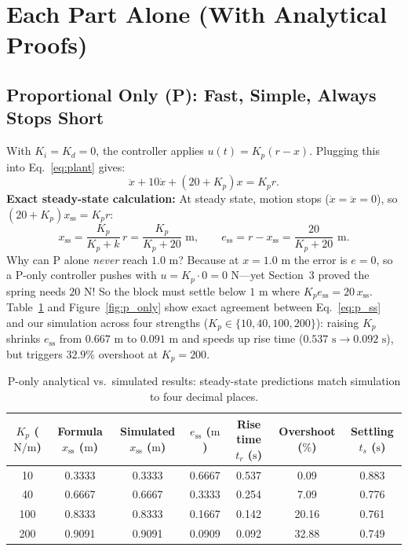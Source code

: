 \documentclass[10pt,a4paper]{article}
\begin{document}
\section{Each Part Alone (With Analytical Proofs)}

\subsection{Proportional Only (P): Fast, Simple, Always Stops Short}
With $K_i = K_d = 0$, the controller applies $u(t) = K_p(r - x)$. Plugging this into Eq.~\eqref{eq:plant} gives:
\begin{equation}
  \ddot{x} + 10\dot{x} + (20 + K_p)x = K_p r.
  \label{eq:p_closed}
\end{equation}
\textbf{Exact steady-state calculation:} At steady state, motion stops ($\dot{x} = \ddot{x} = 0$), so $(20 + K_p)x_{\text{ss}} = K_p r$:
\begin{equation}
  x_{\text{ss}} = \frac{K_p}{K_p + k}\,r = \frac{K_p}{K_p + 20}\text{ m}, \qquad
  e_{\text{ss}} = r - x_{\text{ss}} = \frac{20}{K_p + 20}\text{ m}.
  \label{eq:p_ss}
\end{equation}
Why can P alone \emph{never} reach $1.0\text{ m}$? Because at $x = 1.0\text{ m}$ the error is $e = 0$, so a P-only controller pushes with $u = K_p \cdot 0 = 0\text{ N}$---yet Section~3 proved the spring needs $20\text{ N}$! So the block must settle below $1\text{ m}$ where $K_p e_{\text{ss}} = 20\,x_{\text{ss}}$. Table~\ref{tab:p_only} and Figure~\ref{fig:p_only} show exact agreement between Eq.~\eqref{eq:p_ss} and our simulation across four strengths ($K_p \in \{10, 40, 100, 200\}$): raising $K_p$ shrinks $e_{\text{ss}}$ from $0.667\text{ m}$ to $0.091\text{ m}$ and speeds up rise time ($0.537\text{ s} \to 0.092\text{ s}$), but triggers $32.9\%$ overshoot at $K_p = 200$.

\begin{table}[H]
  \centering
  \small
  \begin{tabular}{ccccccc}
    \toprule
    $K_p$ ($\text{N/m}$) & Formula $x_{\text{ss}}$ ($\text{m}$) & Simulated $x_{\text{ss}}$ ($\text{m}$) & $e_{\text{ss}}$ ($\text{m}$) & Rise time $t_r$ ($\text{s}$) & Overshoot ($\%$) & Settling $t_s$ ($\text{s}$) \\
    \midrule
    10  & 0.3333 & 0.3333 & 0.6667 & 0.537 & 0.09  & 0.883 \\
    40  & 0.6667 & 0.6667 & 0.3333 & 0.254 & 7.09  & 0.776 \\
    100 & 0.8333 & 0.8333 & 0.1667 & 0.142 & 20.16 & 0.761 \\
    200 & 0.9091 & 0.9091 & 0.0909 & 0.092 & 32.88 & 0.749 \\
    \bottomrule
  \end{tabular}
  \caption{P-only analytical vs.\ simulated results: steady-state predictions match simulation to four decimal places.}
  \label{tab:p_only}
\end{table}
\end{document}

